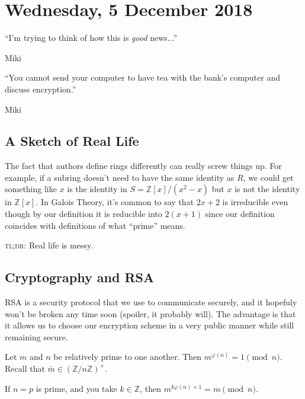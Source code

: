 \section{Wednesday, 5 December 2018}

\epigraph{``I'm trying to think of how this is \emph{good} news...''}{Miki}

\epigraph{``You cannot send your computer to have tea with the bank's computer and discuss encryption.''}{Miki}

\subsection{A Sketch of Real Life}
The fact that authors define rings differently can really screw things up. For example, if a subring doesn't need to have the same identity as $R$, we could get something like $x$ is the identity in $S = \mathbb{Z}[x]/(x^2-x)$ but $x$ is not the identity in $\mathbb{Z}[x]$. In Galois Theory, it's common to say that $2x+2$ is irreducible even though by our definition it is reducible into $2(x+1)$ since our definition coincides with definitions of what ``prime'' means. 

\textsc{tl;dr:} Real life is messy. 

\subsection{Cryptography and RSA}

RSA is a security protocol that we use to communicate securely, and it hopefuly won't be broken any time soon (spoiler, it probably will). The advantage is that it allows us to choose our encryption scheme in a very public manner while still remaining secure.

\begin{theorem}
Let $m$ and $n$ be relatively prime to one another. Then $m^{\varphi(n)} = 1 \pmod{n}$. Recall that $\bar{m} \in (\mathbb{Z}/n\mathbb{Z})^\times$.
\end{theorem}

\begin{proposition}
If $n = p$ is prime, and you take $k \in \mathbb{Z}$, then $m^{k\varphi(n) + 1} = m \pmod{n}$.
\end{proposition}

